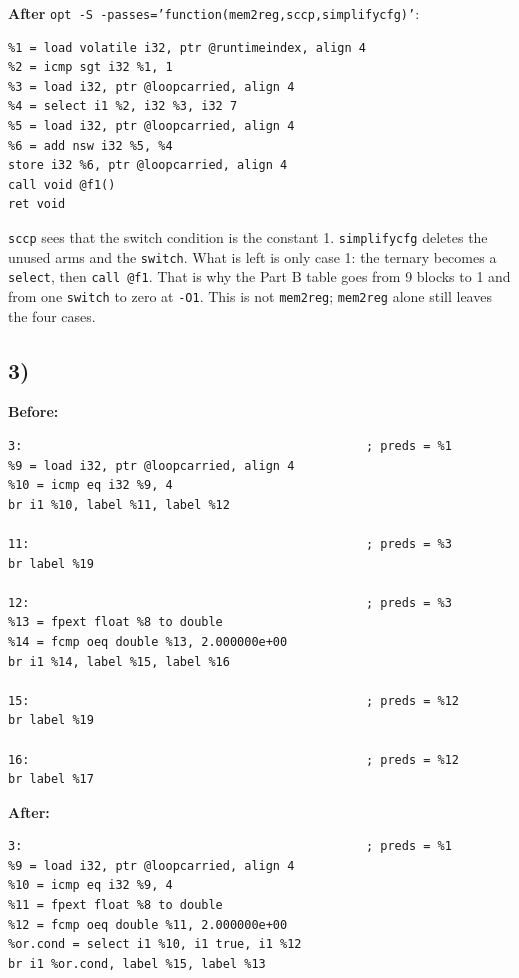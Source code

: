 \documentclass[11pt,a4paper]{article}
\begin{document}
\textbf{After} \texttt{opt -S -passes='function(mem2reg,sccp,simplifycfg)'}:

\begin{lstlisting}
%1 = load volatile i32, ptr @runtimeindex, align 4
%2 = icmp sgt i32 %1, 1
%3 = load i32, ptr @loopcarried, align 4
%4 = select i1 %2, i32 %3, i32 7
%5 = load i32, ptr @loopcarried, align 4
%6 = add nsw i32 %5, %4
store i32 %6, ptr @loopcarried, align 4
call void @f1()
ret void
\end{lstlisting}

\texttt{sccp} sees that the switch condition is the constant 1.
\texttt{simplifycfg} deletes the unused arms and the \texttt{switch}.
What is left is only case 1: the ternary becomes a \texttt{select}, then
\texttt{call @f1}. That is why the Part B table goes from 9 blocks to 1
and from one \texttt{switch} to zero at \texttt{-O1}. This is not
\texttt{mem2reg}; \texttt{mem2reg} alone still leaves the four cases.

\subsection*{3)}

\textbf{Before:}

\begin{lstlisting}
3:                                                ; preds = %1
%9 = load i32, ptr @loopcarried, align 4
%10 = icmp eq i32 %9, 4
br i1 %10, label %11, label %12

11:                                               ; preds = %3
br label %19

12:                                               ; preds = %3
%13 = fpext float %8 to double
%14 = fcmp oeq double %13, 2.000000e+00
br i1 %14, label %15, label %16

15:                                               ; preds = %12
br label %19

16:                                               ; preds = %12
br label %17
\end{lstlisting}

\textbf{After:}

\begin{lstlisting}
3:                                                ; preds = %1
%9 = load i32, ptr @loopcarried, align 4
%10 = icmp eq i32 %9, 4
%11 = fpext float %8 to double
%12 = fcmp oeq double %11, 2.000000e+00
%or.cond = select i1 %10, i1 true, i1 %12
br i1 %or.cond, label %15, label %13
\end{lstlisting}
\end{document}
